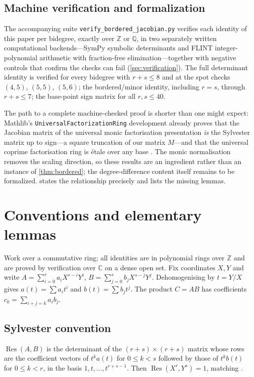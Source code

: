 \documentclass[11pt,reqno]{amsart}
\theoremstyle{definition}
\theoremstyle{remark}
\newcommand{\C}{\mathbb C}
\newcommand{\Z}{\mathbb Z}
\newcommand{\Q}{\mathbb Q}
\newcommand{\Res}{\operatorname{Res}}
\begin{document}
\subsection*{Machine verification and formalization}

The accompanying suite \texttt{verify\_\allowbreak bordered\_\allowbreak jacobian.py}
verifies
each identity of this paper per bidegree, exactly over $\Z$ or
$\Q$, in two separately written computational backends---SymPy symbolic
determinants and FLINT integer-polynomial arithmetic with
fraction-free elimination---together with negative controls that
confirm the checks can fail (\cref{sec:verification}).  The full
determinant identity is verified for every bidegree with
$r+s\le8$ and at the spot checks $(4,5)$, $(5,5)$, $(5,6)$; the
bordered/minor identity, including $r=s$, through $r+s\le7$; the
base-point sign matrix for all $r,s\le40$.

The path to a complete machine-checked proof is shorter than one
might expect: Mathlib's \texttt{UniversalFactorizationRing}
development already proves that the Jacobian matrix of the universal
monic factorisation presentation \emph{is} the Sylvester matrix up to
sign---a square truncation of our matrix $M$---and that the universal
coprime factorisation ring is \'etale over any base
\cite{MathlibUFR,MathlibResultant}.  The monic normalisation removes
the scaling direction, so these results are an ingredient rather
than an instance of \cref{thm:bordered}; the degree-difference
content itself remains to be formalized.   states
the relationship precisely and lists the missing lemmas.

\section{Conventions and elementary lemmas}\label{sec:conventions}

Work over a commutative ring; all identities are in polynomial rings
over $\Z$ and are proved by verification over $\C$ on a dense open
set.  Fix coordinates $X,Y$ and write
$A=\sum_{i=0}^ra_iX^{r-i}Y^i$, $B=\sum_{j=0}^sb_jX^{s-j}Y^j$.
Dehomogenising by $t=Y/X$ gives
$a(t)=\sum a_it^i$ and $b(t)=\sum b_jt^j$.  The product
$C=AB$ has coefficients $c_k=\sum_{i+j=k}a_ib_j$.

\subsection{Sylvester convention}
$\Res(A,B)$ is the determinant of the $(r+s)\times(r+s)$ matrix whose
rows are the coefficient vectors of
$t^ka(t)$ for $0\le k<s$ followed by those of $t^kb(t)$ for
$0\le k<r$, in the basis $1,t,\dots,t^{r+s-1}$.  Then
$\Res(X^r,Y^s)=1$, matching \cite{DDAS}.
\end{document}
